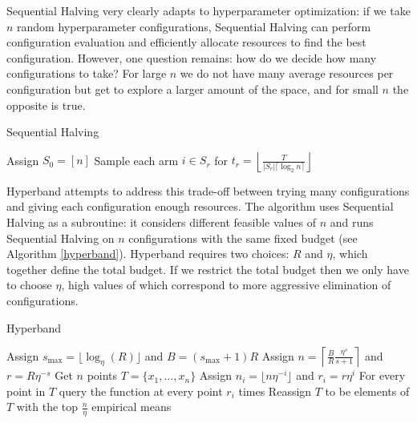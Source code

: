 \documentclass[11pt]{article}
\begin{document}
Sequential Halving very clearly adapts to hyperparameter optimization: if we take $n$ random hyperparameter configurations, Sequential Halving can perform configuration evaluation and efficiently allocate resources to find the best configuration. However, one question remains: how do we decide how many configurations to take? For large $n$ we do not have many average resources per configuration but get to explore a larger amount of the space, and for small $n$ the opposite is true.
\begin{algorithm}
\scriptsize
\caption{Sequential Halving \cite{Karnin2013}}
\label{sequential_halving}
\begin{algorithmic}[1]
\State Assign $S_0 = [n]$
\State Sample each arm $i \in S_r$ for $t_r = \left\lfloor\frac{T}{|S_r|\lceil\log_2 n\rceil}\right\rfloor$
\EndFor
\EndProcedure
\end{algorithmic}
\end{algorithm}
Hyperband \cite{Li2016} attempts to address this trade-off between trying many configurations and giving each configuration enough resources. The algorithm uses Sequential Halving as a subroutine: it considers different feasible values of $n$ and runs Sequential Halving on $n$ configurations with the same fixed budget (see Algorithm \ref{hyperband}). Hyperband requires two choices: $R$ and $\eta$, which together define the total budget. If we restrict the total budget then we only have to choose $\eta$, high values of which correspond to more aggressive elimination of configurations.

\begin{algorithm}
\scriptsize
\caption{Hyperband \cite{Li2016}}
\label{hyperband}
\begin{algorithmic}[1]
\State Assign $s_{\text{max}} = \lfloor \log_\eta(R)\rfloor$ and $B = (s_{\text{max}} + 1)R$
\State Assign $n = \left \lceil \frac{B}{R} \frac{\eta^s}{s+1}\right \rceil$ and $r = R\eta^{-s}$
\State Get $n$ points $T = \{x_1,\ldots,x_n\}$
\State Assign $n_i = \lfloor n\eta^{-i}\rfloor$ and $r_i = r \eta^i$
\State For every point in $T$ query the function at every point $r_i$ times
\State Reassign $T$ to be elements of $T$ with the top $\frac{n}{\eta}$ empirical means
\EndFor
\EndFor
\EndProcedure
\end{algorithmic}
\end{algorithm}
\end{document}

